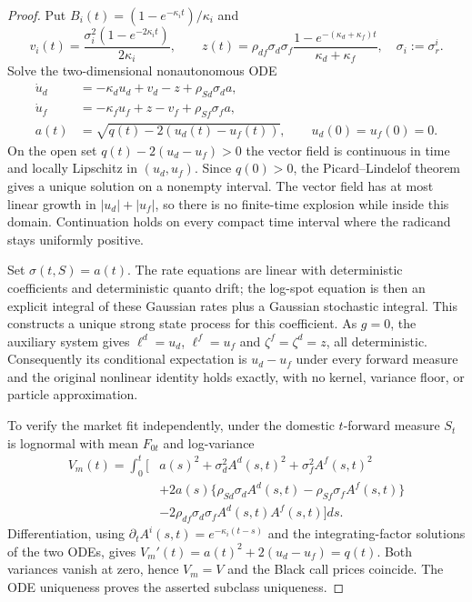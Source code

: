 \begin{proof}
Put $B_i(t)=(1-e^{-\kappa_it})/\kappa_i$ and
\[
v_i(t)=\frac{\sigma_i^2(1-e^{-2\kappa_it})}{2\kappa_i},\qquad
z(t)=\rho_{df}\sigma_d\sigma_f
       \frac{1-e^{-(\kappa_d+\kappa_f)t}}{\kappa_d+\kappa_f},
\quad \sigma_i:=\sigma_r^i.
\]
Solve the two-dimensional nonautonomous ODE
\begin{align*}
\dot u_d&=-\kappa_du_d+v_d-z+\rho_{Sd}\sigma_d a,\\
\dot u_f&=-\kappa_fu_f+z-v_f+\rho_{Sf}\sigma_f a,\\
a(t)&=\sqrt{q(t)-2(u_d(t)-u_f(t))},\qquad u_d(0)=u_f(0)=0.
\end{align*}
On the open set $q(t)-2(u_d-u_f)>0$ the vector field is continuous in time
and locally Lipschitz in $(u_d,u_f)$. Since $q(0)>0$, the Picard--Lindelof
theorem gives a unique solution on a nonempty interval. The vector field has
at most linear growth in $|u_d|+|u_f|$, so there is no finite-time explosion
while inside this domain. Continuation holds on every compact time interval
where the radicand stays uniformly positive.

Set $\sigma(t,S)=a(t)$. The rate equations are linear with deterministic
coefficients and deterministic quanto drift; the log-spot equation is then an
explicit integral of these Gaussian rates plus a Gaussian stochastic integral.
This constructs a unique strong state process for this coefficient.
As $g=0$, the auxiliary system gives $\ell^d=u_d$, $\ell^f=u_f$ and
$\zeta^f=\zeta^d=z$, all deterministic. Consequently its conditional expectation
is $u_d-u_f$ under every forward measure and the original nonlinear identity
holds exactly, with no kernel, variance floor, or particle approximation.

To verify the market fit independently, under the domestic $t$-forward measure
$S_t$ is lognormal with mean $F_{0t}$ and log-variance
\begin{align*}
V_m(t)=\int_0^t\Big[&a(s)^2+
\sigma_d^2 A^d(s,t)^2+\sigma_f^2 A^f(s,t)^2\\
&+2a(s)\{\rho_{Sd}\sigma_d A^d(s,t)-\rho_{Sf}\sigma_f A^f(s,t)\}\\
&-2\rho_{df}\sigma_d\sigma_f A^d(s,t)A^f(s,t)\Big]ds.
\end{align*}
Differentiation, using $\partial_t A^i(s,t)=e^{-\kappa_i(t-s)}$
and the integrating-factor solutions of the two ODEs, gives
$V_m'(t)=a(t)^2+2(u_d-u_f)=q(t)$. Both variances vanish at zero, hence
$V_m=V$ and the Black call prices coincide. The ODE uniqueness proves the
asserted subclass uniqueness.
\end{proof}

